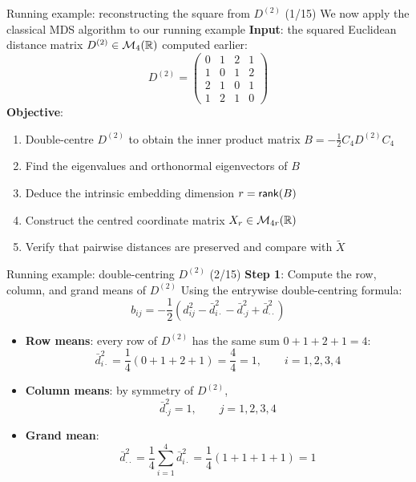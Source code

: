 \documentclass[aspectratio=169]{beamer}\usepackage[]{graphicx}\usepackage[]{xcolor}
\begin{document}

\begin{frame}{Running example: reconstructing the square from $D^{(2)}$ (1/15)}
We now apply the classical MDS algorithm to our running example
\vfill
\textbf{Input}: the squared Euclidean distance matrix $D^{(2)}\in\mathcal{M}_4(\mathbb{R})$ computed earlier:
\[
D^{(2)} = \begin{pmatrix}
0 & 1 & 2 & 1 \\
1 & 0 & 1 & 2 \\
2 & 1 & 0 & 1 \\
1 & 2 & 1 & 0
\end{pmatrix}
\]
\vfill
\textbf{Objective}:
\begin{enumerate}
\item Double-centre $D^{(2)}$ to obtain the inner product matrix $B = -\frac{1}{2} C_4 D^{(2)} C_4$
\item Find the eigenvalues and orthonormal eigenvectors of $B$
\item Deduce the intrinsic embedding dimension $r = \mathsf{rank}(B)$
\item Construct the centred coordinate matrix $X_r \in \mathcal{M}_{4r}(\mathbb{R})$
\item Verify that pairwise distances are preserved and compare with $\widetilde{X}$
\end{enumerate}
\end{frame}

\begin{frame}{Running example: double-centring $D^{(2)}$ (2/15)}
\textbf{Step 1}: Compute the row, column, and grand means of $D^{(2)}$
\vfill
Using the entrywise double-centring formula:
\[
b_{ij} = -\frac{1}{2}\left(d_{ij}^2 - \bar{d}_{i\cdot}^2 - \bar{d}_{\cdot j}^2 + \bar{d}_{\cdot\cdot}^2\right)
\]
\vfill
\begin{itemize}
\item \textbf{Row means}: every row of $D^{(2)}$ has the same sum $0 + 1 + 2 + 1 = 4$:
\[
\bar{d}_{i\cdot}^2 = \frac{1}{4}(0 + 1 + 2 + 1) = \frac{4}{4} = 1, \qquad i = 1, 2, 3, 4
\]
\vfill
\item \textbf{Column means}: by symmetry of $D^{(2)}$,
\[
\bar{d}_{\cdot j}^2 = 1, \qquad j = 1, 2, 3, 4
\]
\vfill
\item \textbf{Grand mean}:
\[
\bar{d}_{\cdot\cdot}^2 = \frac{1}{4}\sum_{i=1}^4 \bar{d}_{i\cdot}^2 = \frac{1}{4}(1 + 1 + 1 + 1) = 1
\]
\end{itemize}
\end{frame}
\end{document}
